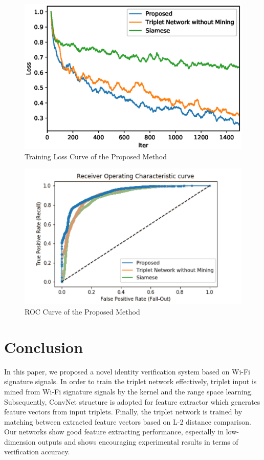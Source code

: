 \documentclass[runningheads]{llncs}
\begin{document}
\begin{figure}
    \includegraphics[width=\textwidth]{normalized_loss_curve_ma30.eps}
    \caption{Training Loss Curve of the Proposed Method} \label{fig2}
\end{figure}
\begin{figure}
    \includegraphics[width=\textwidth]{fig_roc.pdf}
    \caption{ROC Curve of the Proposed Method} \label{fig3}
\end{figure}

\section{Conclusion}
In this paper, we proposed a novel identity verification system based on Wi-Fi signature signals. 
In order to train the triplet network effectively, triplet input is mined from Wi-Fi signature signals by the kernel and the range space learning. Subsequently, ConvNet structure is adopted for feature extractor which generates feature vectors from input triplets. Finally, the triplet network is trained by matching between extracted feature vectors based on L-2 distance comparison. Our networks show good feature extracting performance, especially in low-dimension outputs and shows encouraging experimental results in terms of verification accuracy.
%
%
%
%
%
%






\end{document}
